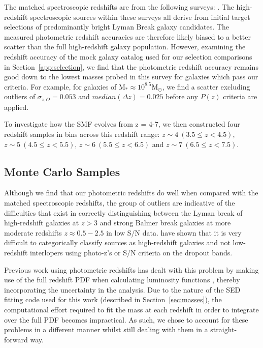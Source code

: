 The matched spectroscopic redshifts are from the following surveys: \citet{LeFvre:2004ge,Stanway:2004gu,Vanzella:2008hp,Hathi:2008ca,Popesso:2009ht,Wuyts:2009gv,Rhoads:2009eb,Vanzella:2009ez,Balestra:2010bt,Kurk:2012ej}. The high-redshift spectroscopic sources within these surveys all derive from initial target selections of predominantly bright Lyman Break galaxy candidates. The measured photometric redshift accuracies are therefore likely biased to a better scatter than the full high-redshift galaxy population. However, examining the redshift accuracy of the mock galaxy catalog used for our selection comparisons in Section~\ref{app:selection}, we find that the photometric redshift accuracy remains good down to the lowest masses probed in this survey for galaxies which pass our criteria. For example, for galaxies of $\text{M}_{*} \approx 10^{8.5} \text{M}_{\odot}$, we find a scatter excluding outliers of $\sigma_{z,O} = 0.053$ and $median(\Delta z) = 0.025$ before any $P(z)$ criteria are applied.

To investigate how the SMF evolves from z = 4-7, we then constructed four redshift samples in bins across this redshift range: $z \sim 4 ~(3.5 \leq z < 4.5)$, $z \sim 5~ (4.5 \leq z < 5.5)$, $z \sim 6~(5.5 \leq z < 6.5)$ and $z \sim 7 ~(6.5 \leq z < 7.5)$.

\subsection{Monte Carlo Samples}\label{sec:MC}
Although we find that our photometric redshifts do well when compared with the matched spectroscopic redshifts, the group of outliers are indicative of the difficulties that exist in correctly distinguishing between the Lyman break of high-redshift galaxies at $z > 3$ and strong Balmer break galaxies at more moderate redshifts $z \approx 0.5-2.5$ in low S/N data. \citet{2012ApJ...748..122P,Pirzkal:2013ug} have shown that it is very difficult to categorically classify sources as high-redshift galaxies and not low-redshift interlopers using photo-z's or S/N criteria on the dropout bands.

Previous work using photometric redshifts has dealt with this problem by making use of the full redshift PDF when calculating luminosity functions \citep{2005ApJ...631..126D,2009MNRAS.395.2196M,McLure:2013hh}, thereby incorporating the uncertainty in the analysis. Due to the nature of the SED fitting code used for this work (described in Section~\ref{sec:masses}), the computational effort required to fit the mass at each redshift in order to integrate over the full PDF becomes impractical. As such, we chose to account for these problems in a different manner whilst still dealing with them in a straight-forward way. 

